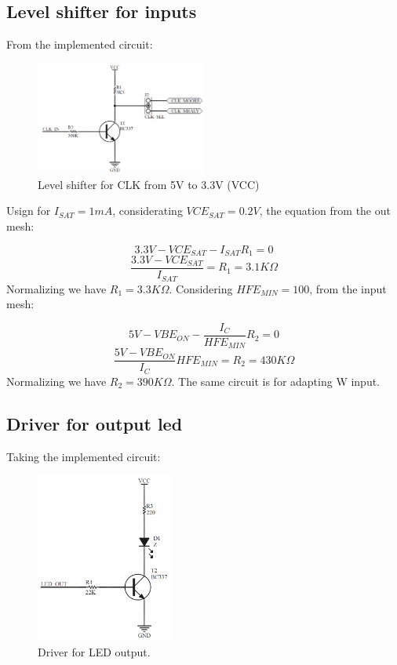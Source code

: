 \subsection*{Level shifter for inputs}
From the implemented circuit:
\begin{figure}[H]
    \begin{centering}
    \includegraphics[width=0.5\textwidth]{data/Graficos3/CLK_Driver.png}
    \par\end{centering}
    \caption{Level shifter for CLK from 5V to 3.3V (VCC)}
\end{figure}

Usign for $I_{SAT} = 1mA$, considerating $VCE_{SAT} = 0.2V$, 
the equation from the out mesh:

$$3.3V - VCE_{SAT} - I_{SAT}R_1 = 0$$
$$\frac{3.3V - VCE_{SAT}}{I_{SAT}} = R_1 = 3.1K\Omega$$
Normalizing we have $R_1 = 3.3K\Omega$.
Considering $HFE_{MIN} = 100$, from the input mesh:

$$5V - VBE_{ON} - \frac{I_C}{HFE_{MIN}}R_2 = 0$$
$$\frac{5V - VBE_{ON}}{I_C}HFE_{MIN} = R_2 = 430K\Omega$$
Normalizing we have $R_2 = 390K\Omega$. The same circuit is 
for adapting W input.
\subsection*{Driver for output led}
Taking the implemented circuit:

\begin{figure}[H]
    \begin{centering}
    \includegraphics[width=0.4\textwidth]{data/Graficos3/LED_Driver.png}
    \par\end{centering}
    \caption{Driver for LED output.}
\end{figure}

